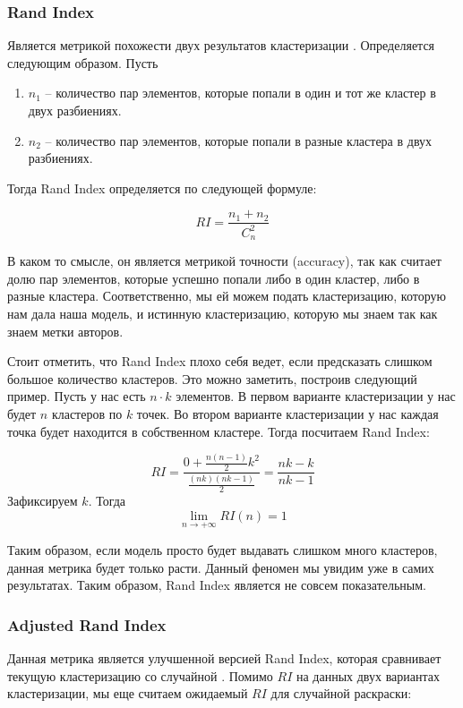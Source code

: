 \subsubsection{Rand Index}

Является метрикой похожести двух результатов кластеризации \cite{rand}. Определяется следующим образом. Пусть

\begin{enumerate}
    \item $n_1$ -- количество пар элементов, которые попали в один и тот же кластер в двух разбиениях.
    \item $n_2$ --  количество пар элементов, которые попали в разные кластера в двух разбиениях.
\end{enumerate}

Тогда Rand Index определяется по следующей формуле:

$$
RI = \frac{n_1 + n_2}{C_n^2}
$$

В каком то смысле, он является метрикой точности (accuracy), так как считает долю пар элементов, которые успешно попали либо в один кластер, либо в разные кластера. Соответственно, мы ей можем подать кластеризацию, которую нам дала наша модель, и истинную кластеризацию, которую мы знаем так как знаем метки авторов.

Стоит отметить, что Rand Index плохо себя ведет, если предсказать слишком большое количество кластеров. Это можно заметить, построив следующий пример. Пусть у нас есть $n \cdot k$ элементов. В первом варианте кластеризации у нас будет $n$ кластеров по $k$ точек. Во втором варианте кластеризации у нас каждая точка будет находится в собственном кластере. Тогда посчитаем Rand Index:

$$
RI = \frac{0 + \frac{n(n-1)}{2}k^2}{\frac{(nk)(nk - 1)}{2}} = \frac{nk - k}{nk - 1}
$$
\noindent
Зафиксируем $k$. Тогда $$\lim_{n \rightarrow +\infty} RI(n) = 1$$

Таким образом, если модель просто будет выдавать слишком много кластеров, данная метрика будет только расти. Данный феномен мы увидим уже в самих результатах. Таким образом, Rand Index является не совсем показательным.

\subsubsection{Adjusted Rand Index}

Данная метрика является улучшенной версией Rand Index, которая сравнивает текущую кластеризацию со случайной \cite{adjusted-rand}. Помимо $RI$ на данных двух вариантах кластеризации, мы еще считаем ожидаемый $RI$ для случайной раскраски:

